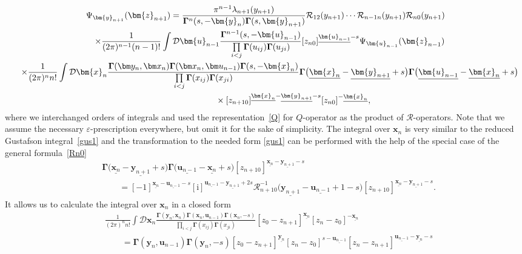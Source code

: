 \documentclass[pdftex]{sigma}
\renewcommand{\imath}{\mathrm{i}}
\numberwithin{equation}{section}
\begin{document}
\begin{gather*}
\Psi_{\bm{y}_{n+1}}(\bm{z}_{n+1}) =
\frac{\pi^{n-1} \lambda_{n+1}(y_{n+1})}{\mathbf{\Gamma}^{n}(s ,-\bm{y}_{n})
\mathbf{\Gamma}(s ,\bm{y}_{n+1})}
\mathcal{R}_{12}(y_{n+1})\cdots
\mathcal{R}_{n-1 n}(y_{n+1})\mathcal{R}_{n 0}(y_{n+1})\\
\quad \times \frac{1}{(2\pi)^{n-1} (n-1)!} \int \mathcal{D}\bm{u}_{n-1}
\frac{\mathbf{\Gamma}^{n-1}(s ,-\bm{u}_{n-1})}
{\prod\limits_{i<j}\mathbf{\Gamma}(u_{ij})\mathbf{\Gamma}(u_{ji})}
[z_{n 0}]^{\underline{\bm{u}_{n-1}}-s}
\Psi_{\bm{u}_{n-1}}(\bm{z}_{n-1})
\\
\quad\times \frac{1}{(2\pi)^n n!} \int \mathcal{D}\bm{x}_{n}
\frac{\mathbf{\Gamma}(\bm y_{n},\bm x_{n})
\mathbf{\Gamma}(\bm x_{n},\bm u_{n-1})
\mathbf{\Gamma}(s ,-\bm{x}_{n})}
{\prod\limits_{i<j}\mathbf{\Gamma}(x_{ij})\mathbf{\Gamma}(x_{ji})}
\mathbf{\Gamma}\bigl(\underline{\bm{x}_{n}}-\underline{\bm{y}_{n+1}}+s\bigr)
\mathbf{\Gamma}\bigl(\underline{\bm{u}_{n-1}}-\underline{\bm{x}_{n}}+s\bigr)\\
\quad\hphantom{\times \frac{1}{(2\pi)^n n!} \int}{}\times [z_{n+1 0}]^{\underline{\bm{x}_{n}}-\underline{\bm{y}_{n+1}}-s}
[z_{n 0}]^{-\underline{\bm{x}_{n}}} ,
\end{gather*}
where we interchanged orders of integrals and used the
representation~\eqref{Q} for $Q$-operator as the product
of $\mathcal{R}$-operators.
Note that we assume the necessary $\varepsilon$-prescription everywhere, but omit it for the sake of simplicity.
The integral over $\bm{x}_{n}$ is very similar to the reduced Gustafson
integral~\eqref{gus1} and the transformation to the needed form
\eqref{gus1} can be performed with the help of the
special case of the general formula~\eqref{Rn0}
\begin{align*}
&
\mathbf{\Gamma}\bigl(\underline{\bm{x}_{n}}-\underline{\bm{y}_{n+1}}+s\bigr)
\mathbf{\Gamma}\bigl(\underline{\bm{u}_{n-1}}-\underline{\bm{x}_{n}}+s\bigr)
[z_{n+1 0}]^{\underline{\bm{x}_{n}}-\underline{\bm{y}_{n+1}}-s} \\
& \qquad =
[-1]^{\underline{\bm{x}_{n}}-\underline{\bm{u}_{n-1}}-s}
[\imath]^{\underline{\bm{u}_{n-1}}-\underline{\bm{y}_{n+1}}+2s}
\mathcal{R}^{-1}_{n+1 0}
\bigl(\underline{\bm{y}_{n+1}}-\underline{\bm{u}_{n-1}}+1-s\bigr)
[z_{n+1 0}]^{\underline{\bm{x}_{n}}-\underline{\bm{y}_{n+1}}-s} .
\end{align*}
It allows us to calculate the integral over $\bm{x}_{n}$
in a closed form
\begin{align*}
&
\frac{1}{(2\pi)^n n!} \int \mathcal{D}\bm{x}_{n}
\frac{\mathbf{\Gamma}(\bm y_{n},\bm x_{n})
\mathbf{\Gamma}(\bm x_{n},\bm u_{n-1})
\mathbf{\Gamma}(\bm{x}_{n} ,-s)}
{\prod\limits_{i<j}\mathbf{\Gamma}(x_{ij})\mathbf{\Gamma}(x_{ji})}
[z_0 -z_{n+1}]^{\underline{\bm{x}_{n}}}
[z_n-z_{0}]^{-\underline{\bm{x}_{n}}} \\
& \qquad =
\mathbf{\Gamma}(\bm y_{n},\bm u_{n-1})
\mathbf{\Gamma}(\bm{y}_{n} ,-s)
[z_0 - z_{n+1}]^{\underline{\bm{y}_{n}}}
[z_{n}-z_0]^{s-\underline{\bm{u}_{n-1}}}
[z_n-z_{n+1}]^{\underline{\bm{u}_{n-1}}-\underline{\bm{y}_{n}}-s}
\end{align*}
\end{document}
